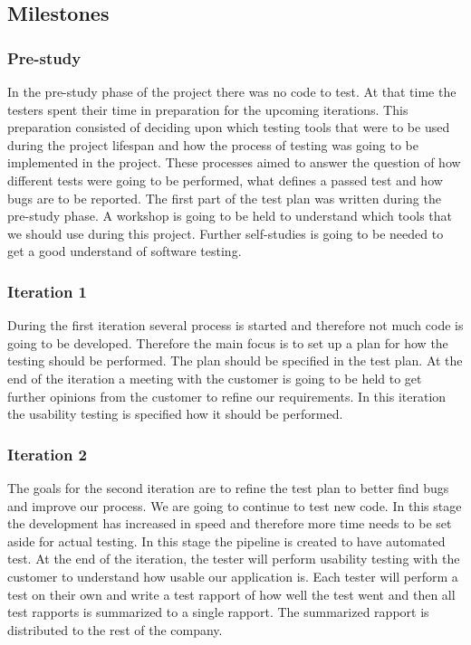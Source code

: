 \subsection{Milestones}
\subsubsection{Pre-study}
\noindent In the pre-study phase of the project there was no code to test. At that time the testers spent their time in preparation for the upcoming iterations. This preparation consisted of deciding upon which testing tools that were to be used during the project lifespan and how the process of testing was going to be implemented in the project. These processes aimed to answer the question of how different tests were going to be performed, what defines a passed test and how bugs are to be reported. The first part of the test plan was written during the pre-study phase. A workshop is going to be held to understand which tools that we should use during this project. Further self-studies is going to be needed to get a good understand of software testing.

\subsubsection{Iteration 1}
During the first iteration several process is started and therefore not much code is going to be developed. Therefore the main focus is to set up a plan for how the testing should be performed. The plan should be specified in the test plan. At the end of the iteration a meeting with the customer is going to be held to get further opinions from the customer to refine our requirements. In this iteration the usability testing is specified how it should be performed.
\subsubsection{Iteration 2}
The goals for the second iteration are to refine the test plan to better find bugs and improve our process. We are going to continue to test new code. In this stage the development has increased in speed and therefore more time needs to be set aside for actual testing. In this stage the pipeline is created to have automated test. At the end of the iteration, the tester will perform usability testing with the customer to understand how usable our application is. Each tester will perform a test on their own and write a test rapport of how well the test went and then all test rapports is summarized to a single rapport. The summarized rapport is distributed to the rest of the company.   
 
